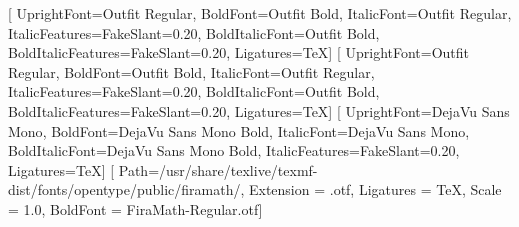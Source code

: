 \usepackage{fontspec}
\usepackage{unicode-math}
\setmainfont{Outfit}[
  UprightFont={Outfit Regular}, BoldFont={Outfit Bold},
  ItalicFont={Outfit Regular}, ItalicFeatures={FakeSlant=0.20},
  BoldItalicFont={Outfit Bold}, BoldItalicFeatures={FakeSlant=0.20},
  Ligatures={TeX}]
\setsansfont{Outfit}[
  UprightFont={Outfit Regular}, BoldFont={Outfit Bold},
  ItalicFont={Outfit Regular}, ItalicFeatures={FakeSlant=0.20},
  BoldItalicFont={Outfit Bold}, BoldItalicFeatures={FakeSlant=0.20},
  Ligatures={TeX}]
\setmonofont{DejaVu Sans Mono}[
  UprightFont={DejaVu Sans Mono}, BoldFont={DejaVu Sans Mono Bold},
  ItalicFont={DejaVu Sans Mono}, BoldItalicFont={DejaVu Sans Mono Bold},
  ItalicFeatures={FakeSlant=0.20}, Ligatures={TeX}]
[
  Path=/usr/share/texlive/texmf-dist/fonts/opentype/public/firamath/,
  Extension = .otf, Ligatures = {TeX}, Scale = 1.0,
  BoldFont = FiraMath-Regular.otf]

